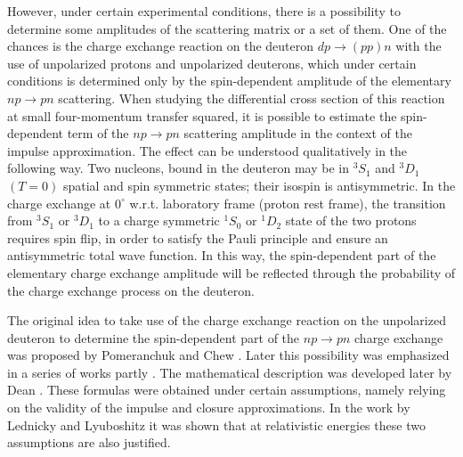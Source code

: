 \documentclass[twocolumn,epjc3]{svjour3}
\newcommand{\np}     {\ensuremath{np \rightarrow pn}\xspace}
\newcommand{\dpchex} {\ensuremath{dp \rightarrow (pp)n}\xspace}
\begin{document}
However, under certain experimental conditions, there is a possibility to
determine some amplitudes of the scattering matrix or a set of them. One of the
chances is the charge exchange reaction on the deuteron \dpchex with the use of
unpolarized protons and unpolarized deuterons, which under certain conditions is
determined only by the spin-dependent amplitude of the elementary \np
scattering. When studying the differential cross section of this reaction at
small four-momentum transfer squared, it is possible to estimate the
spin-dependent term of the \np scattering amplitude in the context of the
impulse approximation. The effect can be understood qualitatively in the
following way. Two nucleons, bound in the deuteron may be in $^3S_1$ and $^3D_1$
$(T = 0)$ spatial and spin symmetric states; their isospin is antisymmetric. In
the charge exchange at $0^\circ$ w.r.t. laboratory frame (proton rest frame),
the transition from $^3S_1$ or $^3D_1$ to a charge symmetric $^1S_0$ or $^1D_2$
state of the two protons requires spin flip, in order to satisfy the Pauli
principle and ensure an antisymmetric total wave function. In this way, the
spin-dependent part of the elementary charge exchange amplitude will be
reflected through the probability of the charge exchange process on the
deuteron.

The original idea to take use of the charge exchange reaction on the unpolarized
deuteron to determine the spin-dependent part of the \np charge exchange was
proposed by Pomeranchuk \cite{pom51} and Chew \cite{chew51}. Later this
possibility was emphasized in a series of works partly
\cite{mig55,pom51_2,lap57,dea72,dea72_2,ala75,ala75_2,bug87}. The mathematical
description was developed later by Dean \cite{dea72,dea72_2}. These formulas
were obtained under certain assumptions, namely relying on the validity of the
impulse and closure approximations. In the work by Lednicky and Lyuboshitz
\cite{led04} it was shown that at relativistic energies these two assumptions
are also justified.
\end{document}
